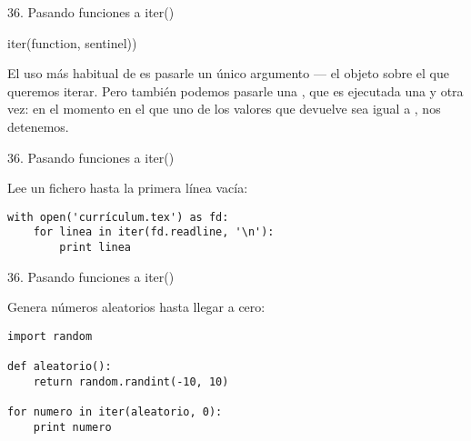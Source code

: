 
\begin{frame}[fragile]{36. Pasando funciones a iter()}
  \begin{block}{}
    \Large
    \centering iter(function, sentinel))
  \end{block}

  \small
  \begin{alertblock}{}
    \centering
    El uso más habitual de  es pasarle un único
    argumento --- el objeto sobre el que queremos iterar. Pero también
    podemos pasarle una , que es ejecutada una y
    otra vez: en el momento en el que uno de los valores que devuelve
    sea igual a , nos detenemos.
  \end{alertblock}
\end{frame}

\begin{frame}[fragile]{36. Pasando funciones a iter()}
  \small
  \begin{exampleblock}
    {Lee un fichero hasta la primera línea vacía:}
    \begin{lstlisting}
with open('currículum.tex') as fd:
    for linea in iter(fd.readline, '\n'):
        print linea
    \end{lstlisting}
  \end{exampleblock}
\end{frame}

\begin{frame}[fragile]{36. Pasando funciones a iter()}
  \small
  \begin{exampleblock}
    {Genera números aleatorios hasta llegar a cero:}
    \begin{lstlisting}
import random

def aleatorio():
    return random.randint(-10, 10)

for numero in iter(aleatorio, 0):
    print numero
    \end{lstlisting}
  \end{exampleblock}
\end{frame}

